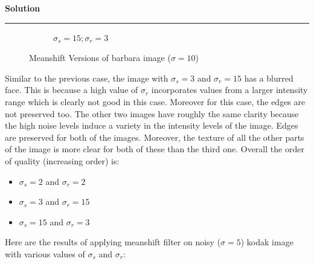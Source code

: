 \documentclass[a4paper]{article}
\newenvironment{solution}[2][]{%
    \begin{mdframed}[linecolor=green!60!black, linewidth=2pt, roundcorner=10pt, backgroundcolor=green!5!white, skipabove=12pt, skipbelow=12pt]%
        \textbf{\large #2} %
        \par\noindent\rule{\textwidth}{0.4pt} %
        \vspace{0.5em} %
}{%
    \end{mdframed}%
}
\begin{document}
\begin{solution}{Solution}
\begin{figure}[H]
\begin{subfigure}[b]{0.24\textwidth}
        \caption{$\sigma_s=15;\sigma_r=3$}
        \label{fig:subfig3}
    \end{subfigure}
    
    \caption{Meanshift Versions of barbara image ($\sigma=10$)}
    \label{fig:overall}
\end{figure}


Similar to the previous case, the image with $\sigma_s=3$ and $\sigma_r=15$ has a blurred face. This is because a high value of $\sigma_r$ incorporates values from a larger intensity range which is clearly not good in this case. Moreover for this case, the edges are not preserved too. The other two images have roughly the same clarity because the high noise levels induce a variety in the intensity levels of the image. Edges are preserved for both of the images. Moreover, the texture of all the other parts of the image is more clear for both of these than the third one. Overall the order of quality (increasing order) is:
\begin{itemize}
    \item $\sigma_s=2$ and $\sigma_r=2$
    \item $\sigma_s=3$ and $\sigma_r=15$
    \item $\sigma_s=15$ and $\sigma_r=3$
\end{itemize}



Here are the results of applying meanshift filter on noisy ($\sigma = 5$) kodak image with various values of $\sigma_s$ and $\sigma_r$:


\end{solution}
\end{document}
